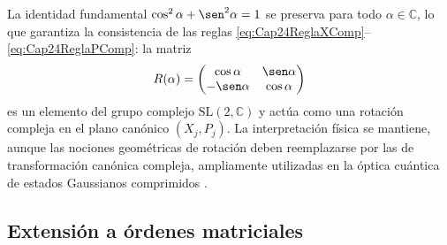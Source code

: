             La identidad fundamental $\cos^2\alpha + \sen^2\alpha = 1$ se preserva para todo $\alpha \in \mathbb{C}$, lo que garantiza la consistencia de las reglas \eqref{eq:Cap24ReglaXComp}--\eqref{eq:Cap24ReglaPComp}: la matriz
            \begin{equation*}
                R(\alpha) = \begin{pmatrix} \cos\alpha & \sen\alpha \\ -\sen\alpha & \cos\alpha \end{pmatrix}
            \end{equation*}
            es un elemento del grupo complejo $\mathrm{SL}(2,\mathbb{C})$ y actúa como una rotación compleja en el plano canónico $(X_j, P_j)$. La interpretación física se mantiene, aunque las nociones geométricas de rotación deben reemplazarse por las de transformación canónica compleja, ampliamente utilizadas en la óptica cuántica de estados Gaussianos comprimidos \citep{kutay2002fractional}.

       \subsection{Extensión a órdenes matriciales}